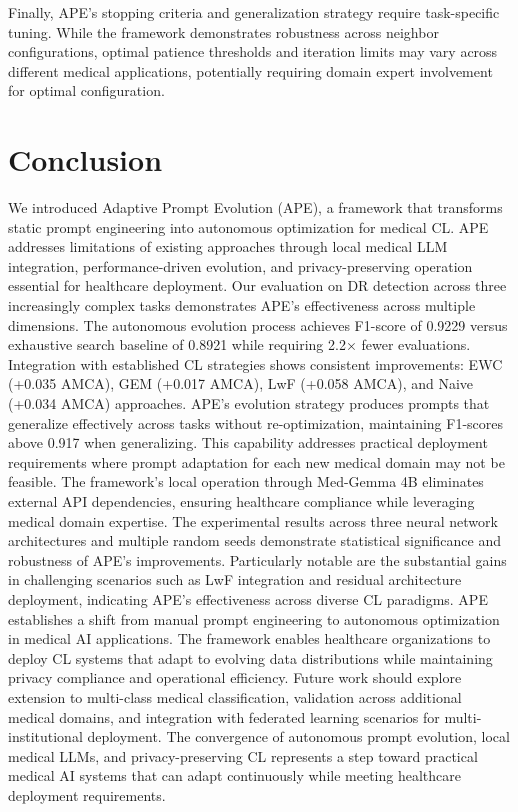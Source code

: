 \documentclass[pdflatex,sn-mathphys-num]{sn-jnl}%
\theoremstyle{thmstyleone}%
\theoremstyle{thmstyletwo}%
\theoremstyle{thmstylethree}%
\begin{document}
Finally, APE's stopping criteria and generalization strategy require task-specific tuning. While the framework demonstrates robustness across neighbor configurations, optimal patience thresholds and iteration limits may vary across different medical applications, potentially requiring domain expert involvement for optimal configuration.

\section{Conclusion}
\label{sec:conclusion}

We introduced Adaptive Prompt Evolution (APE), a framework that transforms static prompt engineering into autonomous optimization for medical CL. APE addresses limitations of existing approaches through local medical LLM integration, performance-driven evolution, and privacy-preserving operation essential for healthcare deployment. Our evaluation on DR detection across three increasingly complex tasks demonstrates APE's effectiveness across multiple dimensions. The autonomous evolution process achieves F1-score of 0.9229 versus exhaustive search baseline of 0.8921 while requiring 2.2× fewer evaluations. Integration with established CL strategies shows consistent improvements: EWC (+0.035 AMCA), GEM (+0.017 AMCA), LwF (+0.058 AMCA), and Naive (+0.034 AMCA) approaches. APE's evolution strategy produces prompts that generalize effectively across tasks without re-optimization, maintaining F1-scores above 0.917 when generalizing. This capability addresses practical deployment requirements where prompt adaptation for each new medical domain may not be feasible. The framework's local operation through Med-Gemma 4B eliminates external API dependencies, ensuring healthcare compliance while leveraging medical domain expertise. The experimental results across three neural network architectures and multiple random seeds demonstrate statistical significance and robustness of APE's improvements. Particularly notable are the substantial gains in challenging scenarios such as LwF integration and residual architecture deployment, indicating APE's effectiveness across diverse CL paradigms.
APE establishes a shift from manual prompt engineering to autonomous optimization in medical AI applications. The framework enables healthcare organizations to deploy CL systems that adapt to evolving data distributions while maintaining privacy compliance and operational efficiency. Future work should explore extension to multi-class medical classification, validation across additional medical domains, and integration with federated learning scenarios for multi-institutional deployment. The convergence of autonomous prompt evolution, local medical LLMs, and privacy-preserving CL represents a step toward practical medical AI systems that can adapt continuously while meeting healthcare deployment requirements.
\end{document}
